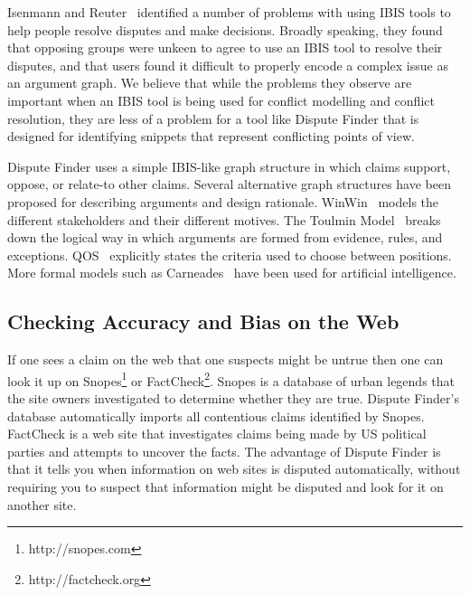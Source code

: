 \documentclass{www2010-submission}
\begin{document}
Isenmann and Reuter~\cite{Isenmann1997} identified a number of problems with using IBIS tools to help people resolve disputes and make decisions. Broadly speaking, they found that opposing groups were unkeen to agree to use an IBIS tool to resolve their disputes, and that users found it difficult to properly encode a complex issue as an argument graph. We believe that while the problems they observe are important when an IBIS tool is being used for conflict modelling and conflict resolution, they are less of a problem for a tool like Dispute Finder that is designed for identifying snippets that represent conflicting points of view.

Dispute Finder uses a simple IBIS-like graph structure in which claims support, oppose, or relate-to other claims. Several alternative graph structures have been proposed for describing arguments and design rationale. WinWin~\cite{Boehm2006} models the different stakeholders and their different motives. The Toulmin Model~\cite{toulmin1958} breaks down the logical way in which arguments are formed from evidence, rules, and exceptions. QOS~\cite{Maclean1991} explicitly states the criteria used to choose between positions. More formal models such as Carneades~\cite{Gordon2007} have been used for artificial intelligence.

\subsection{Checking Accuracy and Bias on the Web}

If one sees a claim on the web that one suspects might be untrue then one can look it up on Snopes\footnote{http://snopes.com} or FactCheck\footnote{http://factcheck.org}. Snopes is a database of urban legends that the site owners investigated to determine whether they are true. 
Dispute Finder's database automatically imports all contentious claims identified by Snopes.
FactCheck is a web site that investigates claims being made by US political parties and attempts to uncover the facts. The advantage of Dispute Finder is that it tells you when information on web sites is disputed automatically, without requiring you to suspect that information might be disputed and look for it on another site.


\end{document}
